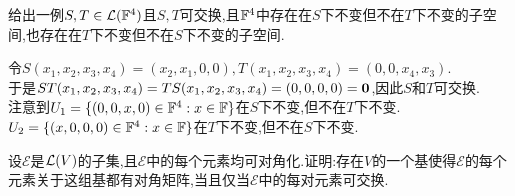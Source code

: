 \documentclass{ctexart}
\begin{document}
\pagestyle{empty}
\begin{center}
    \large{}
\end{center}
\begin{problem}[1.]
    给出一例$S,T\in\mathcal{L}(\mathbb{F}^4)$且$S,T$可交换,且$\mathbb{F}^4$中存在在$S$下不变但不在$T$下不变的子空间,也存在在$T$下不变但不在$S$下不变的子空间.
\end{problem}
\begin{solution}
    令$S(x_1,x_2,x_3,x_4)=(x_2,x_1,0,0),T(x_1,x_2,x_3,x_4)=(0,0,x_4,x_3)$.\\
    于是$ST(x_1,x_2,x_3,x_4)=TS(x_1,x_2,x_3,x_4)=(0,0,0,0)=\mathbf0$,因此$S$和$T$可交换.\\
    注意到$U_1=\{(0,0,x,0)\in\mathbb{F}^4:x\in\mathbb{F}\}$在$S$下不变,但不在$T$下不变.\\
    $U_2=\{(x,0,0,0)\in\mathbb{F}^4:x\in\mathbb{F}\}$在$T$下不变,但不在$S$下不变.
\end{solution}
\begin{problem}[2.]
    设$\mathcal{E}$是$\mathcal{L}(V)$的子集,且$\mathcal{E}$中的每个元素均可对角化.证明:存在$V$的一个基使得$\mathcal{E}$的每个元素关于这组基都有对角矩阵,当且仅当$\mathcal{E}$中的每对元素可交换.
\end{problem}
\end{document}
